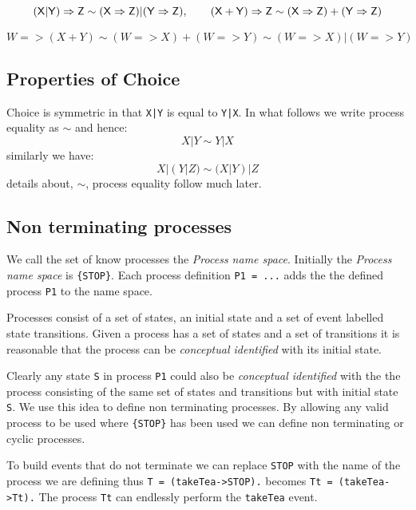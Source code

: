 \documentclass[]{article}
\begin{document}
\[\sf (X|Y)=>Z \sim (X=>Z)| (Y=>Z), \qquad 
(X+Y)=>Z \sim (X=>Z)+ (Y=>Z)\] 

\[W=>(X+Y) \sim (W=>X)+ (W=>Y) \sim (W=>X)| (W=>Y)\]


\subsection{Properties of Choice}
 Choice is symmetric in that \verb$X|Y$ is equal to \verb$Y|X$. In what follows we write process equality as $\sim$ and hence:
 \[X|Y\sim Y|X\]
 similarly we have:
 \[X|(Y|Z)\sim (X|Y)|Z\]
 details about, $\sim$,  process equality follow much later.


\subsection{Non terminating processes}
We call the set of know  processes  the  \emph{Process name space}.   Initially the  \emph{Process name space} is \verb${STOP}$.    Each process definition \verb$P1 = ...$ adds the the defined process \verb$P1$ to the name space.

Processes consist of a set of states, an initial state  and a set of event labelled state transitions. Given  a process has a set of states and a set of transitions it is reasonable that the process can be \emph{conceptual identified} with its initial state.


Clearly any state \verb$S$ in process \verb|P1| could also  be \emph{conceptual identified}  with the the process consisting of the same set of states and transitions but with initial state \verb$S$.  We use this idea to define non terminating processes.  By allowing any valid process to be used where \verb${STOP}$ has been used we can define non terminating or cyclic processes.


To build events that do not terminate we can replace \verb$STOP$ with the name of the process we are defining thus \verb$T = (takeTea->STOP).$ becomes \verb$Tt = (takeTea->Tt).$  The  process \verb$Tt$ can endlessly perform the \verb$takeTea$ event.
\end{document}
